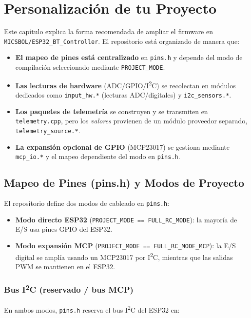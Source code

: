 \chapter{Personalización de tu Proyecto}

Este capítulo explica la forma recomendada de ampliar el firmware en
\texttt{MICSBOL/ESP32\_BT\_Controller}. El repositorio está organizado de manera que:

\begin{itemize}
    \item \textbf{El mapeo de pines está centralizado} en \texttt{pins.h} y depende del modo de compilación seleccionado
    mediante \texttt{PROJECT\_MODE}.
    \item \textbf{Las lecturas de hardware} (ADC/GPIO/I\textsuperscript{2}C) se recolectan en módulos dedicados como
    \texttt{input\_hw.*} (lecturas ADC/digitales) y \texttt{i2c\_sensors.*}.
    \item \textbf{Los paquetes de telemetría} se construyen y se transmiten en \texttt{telemetry.cpp}, pero los \emph{valores}
    provienen de un módulo proveedor separado, \texttt{telemetry\_source.*}.
    \item \textbf{La expansión opcional de GPIO} (MCP23017) se gestiona mediante \texttt{mcp\_io.*} y el mapeo dependiente
    del modo en \texttt{pins.h}.
\end{itemize}

\section{Mapeo de Pines (pins.h) y Modos de Proyecto}

El repositorio define dos modos de cableado en \texttt{pins.h}:

\begin{itemize}
    \item \textbf{Modo directo ESP32} (\texttt{PROJECT\_MODE == FULL\_RC\_MODE}): la mayoría de E/S usa pines GPIO del ESP32.
    \item \textbf{Modo expansión MCP} (\texttt{PROJECT\_MODE == FULL\_RC\_MODE\_MCP}): la E/S digital se amplía usando un
    MCP23017 por I\textsuperscript{2}C, mientras que las salidas PWM se mantienen en el ESP32.
\end{itemize}

\subsection{Bus I\textsuperscript{2}C (reservado / bus MCP)}
En ambos modos, \texttt{pins.h} reserva el bus I\textsuperscript{2}C del ESP32 en:

